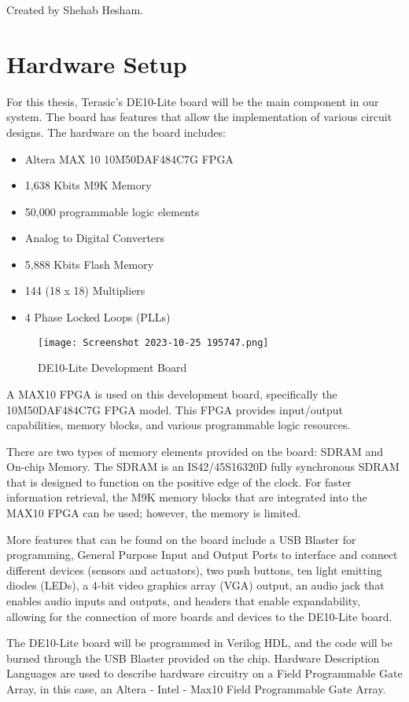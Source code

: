 	Created by Shehab Hesham.

\section{Hardware Setup}
\par For this thesis, Terasic's DE10-Lite board will be the main component in our system. The board has features that allow the implementation of various circuit designs. The hardware on the board includes: \begin{itemize}
    \item Altera MAX 10 10M50DAF484C7G FPGA
    \item 1,638 Kbits M9K Memory
    \item 50,000 programmable logic elements
    \item Analog to Digital Converters
    \item 5,888 Kbits Flash Memory
    \item 144 (18 x 18) Multipliers
    \item 4 Phase Locked Loops (PLLs)
\end{itemize} 
\begin{figure}[H]
    \centering
    \texttt{[image: Screenshot 2023-10-25 195747.png]}
    \caption{DE10-Lite Development Board \cite{figfour}}
    \label{fig:boardFeatures}  
\end{figure}
\par A MAX10 FPGA is used on this development board, specifically the 10M50DAF484C7G FPGA model. This FPGA provides input/output capabilities, memory blocks, and various programmable logic resources.\newline
\par There are two types of memory elements provided on the board: SDRAM and On-chip Memory. The SDRAM is an IS42/45S16320D fully synchronous SDRAM that is designed to function on the positive edge of the clock. For faster information retrieval, the M9K memory blocks that are integrated into the MAX10 FPGA can be used; however, the memory is limited. \newline
\par More features that can be found on the board include a USB Blaster for programming, General Purpose Input and Output Ports to interface and connect different devices (sensors and actuators), two push buttons, ten light emitting diodes (LEDs), a 4-bit video graphics array (VGA) output, an audio jack that enables audio inputs and outputs, and headers that enable expandability, allowing for the connection of more boards and devices to the DE10-Lite board. \newline
\par The DE10-Lite board will be programmed in Verilog HDL, and the code will be burned through the USB Blaster provided on the chip. Hardware Description Languages are used to describe hardware circuitry on a Field Programmable Gate Array, in this case, an Altera - Intel - Max10 Field Programmable Gate Array.\newline

